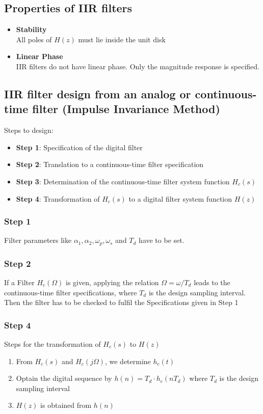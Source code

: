 \documentclass[accentcolor=tud4c,9.5pt,nochapname,bigchapter,paper=a5report]{tudreport}
\begin{document}
 
\subsection{Properties of IIR filters}
\begin{itemize}
  \item {\bf Stability}\\ All poles of $H(z)$ must lie inside the unit disk
  \item {\bf Linear Phase}\\ IIR filters do not have linear phase. Only the magnitude response is specified.
\end{itemize}

\subsection{IIR filter design from an analog or continuous-time filter (Impulse Invariance Method)}
Steps to design:
\begin{itemize}
  \item {\bf Step 1}: Specification of the digital filter
  \item {\bf Step 2}: Translation to a continuous-time filter specification
  \item {\bf Step 3}: Determination of the continuous-time filter system function $H_c(s)$
  \item {\bf Step 4}: Transformation of $H_c(s)$ to a digital filter system function $H(z)$
\end{itemize}
\subsubsection{Step 1}
Filter parameters like $\alpha_1,\alpha_2,\omega_p,\omega_s$ and $T_d$ have to be set.
\subsubsection{Step 2}
If a Filter $H_c(\Omega)$ is given, applying the relation $\Omega=\omega/T_d$ leads to the continuous-time filter specifications, where $T_d$ 
is the design sampling interval. Then the filter has to be checked to fulfil the Specifications given in Step 1

\subsubsection{Step 4}
Steps for the transformation of $H_c(s)$ to $H(z)$
\begin{enumerate}
  \item From $H_c(s)$ and $H_c(j\Omega)$, we determine $h_c(t)$
  \item Optain the digital sequence by $h(n)=T_d\cdot h_c(nT_d)$ where $T_d$ is the design sampling interval
  \item $H(z)$ is obtained from $h(n)$
\end{enumerate}
\end{document}
